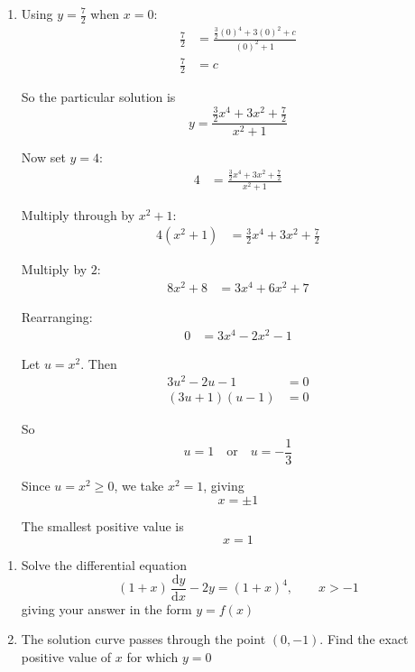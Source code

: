 \documentclass[leqno]{article}
\begin{document}
\begin{enumerate}[
  label=\textbf{\arabic*.},
  leftmargin=*,
  topsep=0pt,
  partopsep=0pt,
  parsep=0pt
]
\begin{djsSolution}
\begin{enumerate}[label=\textbf{(\alph*)}]
  Hence the general solution is
  \[
  y=\frac{\frac{3}{2}x^4+3x^2+c}{x^2+1}
  \]

  \item Using $y=\tfrac{7}{2}$ when $x=0$:
  \begin{align*}
  \frac{7}{2}&=\frac{\frac{3}{2}(0)^4+3(0)^2+c}{(0)^2+1} \\
  \frac{7}{2}&=c
  \end{align*}

  So the particular solution is
  \[
  y=\frac{\frac{3}{2}x^4+3x^2+\frac{7}{2}}{x^2+1}
  \]

  Now set $y=4$:
  \begin{align*}
  4&=\frac{\frac{3}{2}x^4+3x^2+\frac{7}{2}}{x^2+1}
  \end{align*}

  Multiply through by $x^2+1$:
  \begin{align*}
  4(x^2+1)&=\frac{3}{2}x^4+3x^2+\frac{7}{2}
  \end{align*}

  Multiply by $2$:
  \begin{align*}
  8x^2+8&=3x^4+6x^2+7
  \end{align*}

  Rearranging:
  \begin{align*}
  0&=3x^4-2x^2-1
  \end{align*}

  Let $u=x^2$. Then
  \begin{align*}
  3u^2-2u-1&=0 \\
  (3u+1)(u-1)&=0
  \end{align*}

  So
  \[
  u=1 \quad \text{or} \quad u=-\frac{1}{3}
  \]

  Since $u=x^2\geq 0$, we take $x^2=1$, giving
  \[
  x=\pm 1
  \]

  The smallest positive value is
  \[
  x=1
  \]
\end{enumerate}
\end{djsSolution}


\newpage

\questionitem

\begin{enumerate}[label=\textbf{(\alph*)}]
  \item Solve the differential equation
  \[
  (1+x)\,\frac{\mathrm{d}y}{\mathrm{d}x}-2y=(1+x)^4,\qquad x>-1
  \]
  giving your answer in the form $y=f(x)$  \\
  \item The solution curve passes through the point $(0,-1)$. Find the exact positive value of $x$ for which $y=0$  \\
\end{enumerate}


\end{enumerate}
\end{document}
